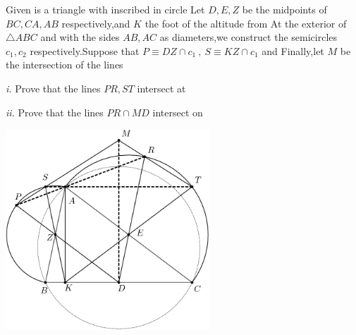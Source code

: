 Given is a triangle with inscribed in circle Let $D,E,Z$ be the midpoints of $BC,CA,AB$ respectively,and $K$ the foot of the altitude from At the exterior of $\triangle{ABC}$ and with the sides $AB,AC$ as diameters,we construct the semicircles $c_1,c_2$ respectively.Suppose that $P\equiv DZ\cap c_1 \ , \ S\equiv KZ\cap c_1$ and Finally,let $M$ be the intersection of the lines 

\textit{i.} Prove that the lines $PR,ST$ intersect at 

\textit{ii.} Prove that the lines $PR\cap MD$ intersect on 

\begin{center}
\includegraphics[width = 76.4mm]{img/fig0.png}
\end{center}